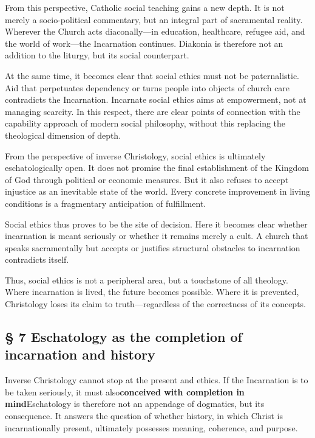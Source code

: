 \documentclass[
]{article}
\begin{document}
From this perspective, Catholic social teaching gains a new depth. It is not merely a socio-political commentary, but an integral part of sacramental reality. Wherever the Church acts diaconally---in education, healthcare, refugee aid, and the world of work---the Incarnation continues. Diakonia is therefore not an addition to the liturgy, but its social counterpart.

At the same time, it becomes clear that social ethics must not be paternalistic. Aid that perpetuates dependency or turns people into objects of church care contradicts the Incarnation. Incarnate social ethics aims at empowerment, not at managing scarcity. In this respect, there are clear points of connection with the capability approach of modern social philosophy, without this replacing the theological dimension of depth.

From the perspective of inverse Christology, social ethics is ultimately eschatologically open. It does not promise the final establishment of the Kingdom of God through political or economic measures. But it also refuses to accept injustice as an inevitable state of the world. Every concrete improvement in living conditions is a fragmentary anticipation of fulfillment.

Social ethics thus proves to be the site of decision. Here it becomes clear whether incarnation is meant seriously or whether it remains merely a cult. A church that speaks sacramentally but accepts or justifies structural obstacles to incarnation contradicts itself.

Thus, social ethics is not a peripheral area, but a touchstone of all theology. Where incarnation is lived, the future becomes possible. Where it is prevented, Christology loses its claim to truth---regardless of the correctness of its concepts.

\subsection{\texorpdfstring{\textbf{§ 7 Eschatology as the completion of incarnation and history}}{§ 7 Eschatology as the completion of incarnation and history}}\label{eschatology-as-the-completion-of-incarnation-and-history}

Inverse Christology cannot stop at the present and ethics. If the Incarnation is to be taken seriously, it must also\textbf{conceived with completion in mind}Eschatology is therefore not an appendage of dogmatics, but its consequence. It answers the question of whether history, in which Christ is incarnationally present, ultimately possesses meaning, coherence, and purpose.
\end{document}
